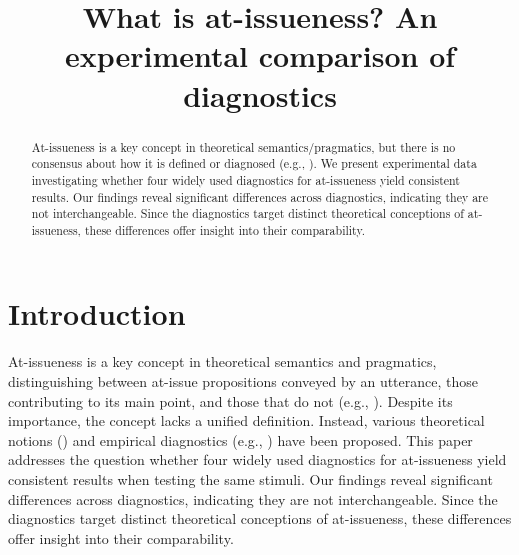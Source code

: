 \documentclass[times,linguex,xcolor]{glossa}
\title[What is at-issueness?]{What is at-issueness? An experimental comparison of diagnostics\\ 
  }
\author[]%
{%
}
\begin{document}
\maketitle


\begin{abstract}
  At-issueness is a key concept in theoretical semantics/pragmatics, but there is no consensus about how it is defined or diagnosed (e.g., \citealt{tonhauser_diagnosing_2012,tonhauser_how_2018,koev_notions_2018}). We present experimental data investigating whether four widely used diagnostics for at-issueness yield consistent results. Our findings reveal significant differences across diagnostics, indicating they are not interchangeable. Since the diagnostics target distinct theoretical conceptions of at-issueness, these differences offer insight into their comparability.

\end{abstract}


\section{Introduction \label{sec:1_introduction}}
  At-issueness is a key concept in theoretical semantics and pragmatics, distinguishing between at-issue propositions conveyed by an utterance, those contributing to its main point, and those that do not (e.g., \citealt{karttunen_conventional_1979,horton_presuppositions_1988,abbott_presuppositions_2000,faller_semantics_2003,potts_logic_2005,tonhauser_diagnosing_2012}). Despite its importance, the concept lacks a unified definition. Instead, various theoretical notions (\citealt{koev_notions_2018,tonhauser_how_2018}) and empirical diagnostics (e.g., \citealt{tonhauser_diagnosing_2012}) have been proposed. This paper addresses the question whether four widely used diagnostics for at-issueness yield consistent results when testing the same stimuli. Our findings reveal significant differences across diagnostics, indicating they are not interchangeable. Since the diagnostics target distinct theoretical conceptions of at-issueness, these differences offer insight into their comparability.

\end{document}
